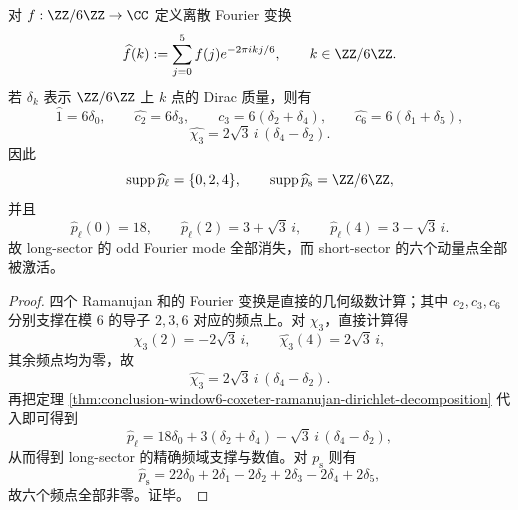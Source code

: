 \begin{corollary}\label{cor:conclusion-window6-fourier-selection-law-arithmetic-support}
对 \(f:\ZZ/6\ZZ\to\CC\) 定义离散 Fourier 变换
\[
\widehat f(k):=\sum_{j=0}^{5} f(j)e^{-2\pi i kj/6},
\qquad
k\in \ZZ/6\ZZ.
\]
若 \(\delta_k\) 表示 \(\ZZ/6\ZZ\) 上 \(k\) 点的 Dirac 质量，则有
\[
\widehat{1}=6\delta_0,\qquad
\widehat{c_2}=6\delta_3,\qquad
\widehat{c_3}=6(\delta_2+\delta_4),\qquad
\widehat{c_6}=6(\delta_1+\delta_5),
\]
\[
\widehat{\chi_3}=2\sqrt3\,i\,(\delta_4-\delta_2).
\]
因此
\[
\operatorname{supp}\widehat p_{\ell}=\{0,2,4\},
\qquad
\operatorname{supp}\widehat p_{\mathrm{s}}=\ZZ/6\ZZ,
\]
并且
\[
\widehat p_{\ell}(0)=18,\qquad
\widehat p_{\ell}(2)=3+\sqrt3\,i,\qquad
\widehat p_{\ell}(4)=3-\sqrt3\,i.
\]
故 long-sector 的 odd Fourier mode 全部消失，而 short-sector 的六个动量点全部被激活。
\end{corollary}
\begin{proof}
四个 Ramanujan 和的 Fourier 变换是直接的几何级数计算；其中 \(c_2,c_3,c_6\) 分别支撑在模 \(6\) 的导子 \(2,3,6\) 对应的频点上。对 \(\chi_3\)，直接计算得
\[
\widehat{\chi_3}(2)=-2\sqrt3\,i,
\qquad
\widehat{\chi_3}(4)=2\sqrt3\,i,
\]
其余频点均为零，故
\[
\widehat{\chi_3}=2\sqrt3\,i\,(\delta_4-\delta_2).
\]
再把定理 \ref{thm:conclusion-window6-coxeter-ramanujan-dirichlet-decomposition} 代入即可得到
\[
\widehat p_{\ell}
=18\delta_0+3(\delta_2+\delta_4)-\sqrt3\,i\,(\delta_4-\delta_2),
\]
从而得到 long-sector 的精确频域支撑与数值。对 \(p_{\mathrm{s}}\) 则有
\[
\widehat p_{\mathrm{s}}=22\delta_0+2\delta_1-2\delta_2+2\delta_3-2\delta_4+2\delta_5,
\]
故六个频点全部非零。证毕。
\end{proof}

